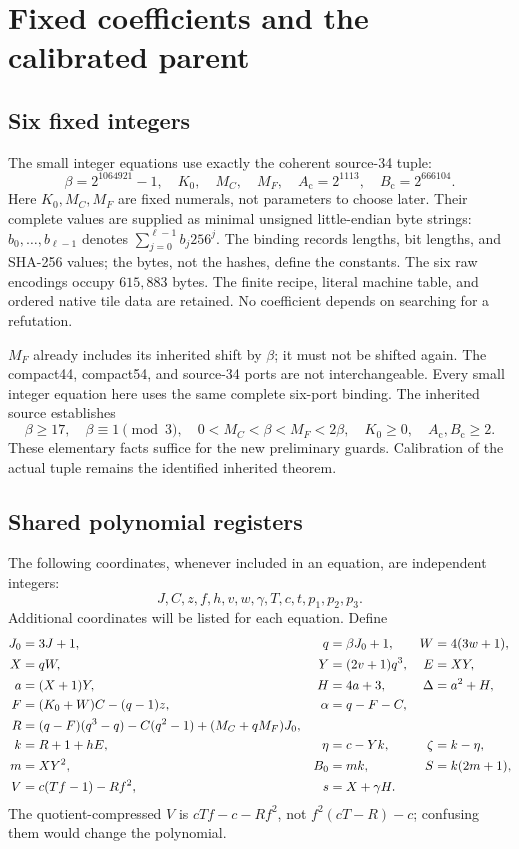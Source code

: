 \documentclass[11pt,letterpaper]{article}
\theoremstyle{remark}\newtheorem{remark}[theorem]{Remark}
\begin{document}
\section{Fixed coefficients and the calibrated parent}\label{sec:source}

\subsection{Six fixed integers}
The small integer equations use exactly the coherent source-34 tuple:
\[
 \beta=2^{1064921}-1,\quad K_0,\quad M_C,\quad M_F,\quad
 A_{\mathrm c}=2^{1113},\quad B_{\mathrm c}=2^{666104}.
\]
Here $K_0,M_C,M_F$ are fixed numerals, not parameters to choose later.
Their complete values are supplied as minimal unsigned little-endian
byte strings: $b_0,\ldots,b_{\ell-1}$ denotes
$\sum_{j=0}^{\ell-1}b_j256^j$.
The binding records lengths, bit lengths, and SHA-256 values; the bytes,
not the hashes, define the constants. The six raw encodings occupy
$615{,}883$ bytes. The finite recipe, literal machine table, and ordered
native tile data are retained. No coefficient depends on searching for
a refutation.

$M_F$ already includes its inherited shift by $\beta$; it must not be
shifted again. The compact44, compact54, and source-34 ports are not
interchangeable. Every small integer equation here uses the same complete
six-port binding. The inherited source establishes
\[
 \beta\ge17,\quad \beta\equiv1\pmod3,\quad
 0<M_C<\beta<M_F<2\beta,\quad K_0\ge0,\quad
 A_{\mathrm c},B_{\mathrm c}\ge2.
\]
These elementary facts suffice for the new preliminary guards. Calibration
of the actual tuple remains the identified inherited theorem.

\subsection{Shared polynomial registers}
The following coordinates, whenever included in an equation, are
independent integers:
\[
 J,C,z,f,h,v,w,\gamma,T,c,t,p_1,p_2,p_3.
\]
Additional coordinates will be listed for each equation. Define
\begin{align}
 J_0&=3J+1,&q&=\beta J_0+1,&W&=4(3w+1),\notag\\
 X&=qW,&Y&=(2v+1)q^3,&E&=XY,\notag\\
 a&=(X+1)Y,&H&=4a+3,&\Delta&=a^2+H,\label{eq:shared1}\\
 F&=(K_0+W)C-(q-1)z,&\alpha&=q-F-C,\notag\\
 R&=(q-F)(q^3-q)-C(q^2-1)+(M_C+qM_F)J_0,\label{eq:R}\\
 k&=R+1+hE,&\eta&=c-Yk,&\zeta&=k-\eta,\notag\\
 m&=XY^2,&B_0&=mk,&S&=k(2m+1),\label{eq:shared2}\\
 V&=c(Tf-1)-Rf^2,&s&=X+\gamma H.\label{eq:V}
\end{align}
The quotient-compressed $V$ is $cTf-c-Rf^2$, not
$f^2(cT-R)-c$; confusing them would change the polynomial.
\end{document}
